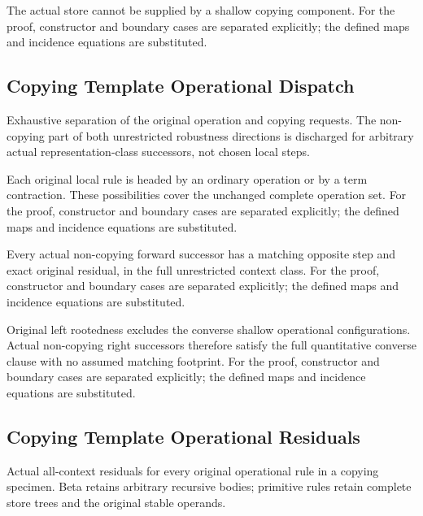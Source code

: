 The actual store cannot be supplied by a shallow copying component.
For the proof, constructor and boundary cases are separated explicitly; the defined maps and incidence equations are substituted.
\par{}

\subsection{Copying Template Operational Dispatch}
Exhaustive separation of the original operation and copying requests. The non-copying part of both unrestricted robustness directions is discharged for arbitrary actual representation-class successors, not chosen local steps.

Each original local rule is headed by an ordinary operation or by a term contraction. These possibilities cover the unchanged complete operation set.
For the proof, constructor and boundary cases are separated explicitly; the defined maps and incidence equations are substituted.
\par{}

Every actual non-copying forward successor has a matching opposite step and exact original residual, in the full unrestricted context class.
For the proof, constructor and boundary cases are separated explicitly; the defined maps and incidence equations are substituted.
\par{}

Original left rootedness excludes the converse shallow operational configurations. Actual non-copying right successors therefore satisfy the full quantitative converse clause with no assumed matching footprint.
For the proof, constructor and boundary cases are separated explicitly; the defined maps and incidence equations are substituted.
\par{}

\subsection{Copying Template Operational Residuals}
Actual all-context residuals for every original operational rule in a copying specimen. Beta retains arbitrary recursive bodies; primitive rules retain complete store trees and the original stable operands.

